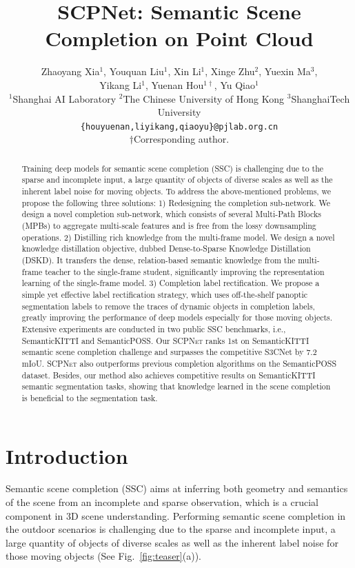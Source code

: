 \documentclass[10pt,twocolumn,letterpaper]{article}
\title{SCPNet: Semantic Scene Completion on Point Cloud}
\author{
  Zhaoyang Xia$^{1}$,\quad
  Youquan Liu$^{1}$,\quad
  Xin Li$^{1}$,\quad
  Xinge Zhu$^{2}$,\quad
  Yuexin Ma$^{3}$,\\
  Yikang Li$^{1}$,\quad
  Yuenan Hou$^{1\dagger}$,\quad
  Yu Qiao$^{1}$\\[4pt]
  $^{1}$Shanghai AI Laboratory\quad
  $^{2}$The Chinese University of Hong Kong\quad
  $^{3}$ShanghaiTech University\\
  \texttt{\{houyuenan,liyikang,qiaoyu\}@pjlab.org.cn}\\[2pt]
  \small{$\dagger$Corresponding author.}
}
\date{}
\newcommand{\methodname}{\textsc{SCPNet}}
\begin{document}
\maketitle

\begin{abstract}
Training deep models for semantic scene completion (SSC) is challenging due to the sparse and incomplete input, a large quantity of objects of diverse scales as well as the inherent label noise for moving objects.
To address the above-mentioned problems, we propose the following three solutions:
1) Redesigning the completion sub-network. We design a novel completion sub-network, which consists of several Multi-Path Blocks (MPBs) to aggregate multi-scale features and is free from the lossy downsampling operations.
2) Distilling rich knowledge from the multi-frame model. We design a novel knowledge distillation objective, dubbed Dense-to-Sparse Knowledge Distillation (DSKD). It transfers the dense, relation-based semantic knowledge from the multi-frame teacher to the single-frame student, significantly improving the representation learning of the single-frame model.
3) Completion label rectification. We propose a simple yet effective label rectification strategy, which uses off-the-shelf panoptic segmentation labels to remove the traces of dynamic objects in completion labels, greatly improving the performance of deep models especially for those moving objects.
Extensive experiments are conducted in two public SSC benchmarks, i.e., SemanticKITTI and SemanticPOSS. Our \methodname{} ranks 1st on SemanticKITTI semantic scene completion challenge and surpasses the competitive S3CNet \cite{diederikpkingma2015} by 7.2 mIoU. \methodname{} also outperforms previous completion algorithms on the SemanticPOSS dataset. Besides, our method also achieves competitive results on SemanticKITTI semantic segmentation tasks, showing that knowledge learned in the scene completion is beneficial to the segmentation task.
\end{abstract}


\section{Introduction}

Semantic scene completion (SSC) \cite{haotiantang2020} aims at inferring both geometry and semantics of the scene from an incomplete and sparse observation, which is a crucial component in 3D scene understanding. Performing semantic scene completion in the outdoor scenarios is challenging due to the sparse and incomplete input, a large quantity of objects of diverse scales as well as the inherent label noise for those moving objects (See Fig.~\ref{fig:teaser}(a)).
\end{document}
